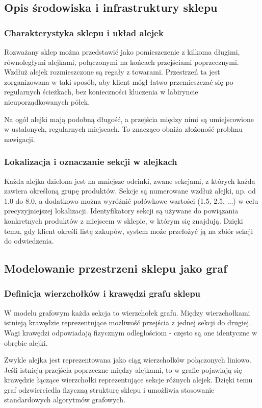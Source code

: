 \subsection{Opis środowiska i infrastruktury sklepu}

\subsubsection{Charakterystyka sklepu i układ alejek}
Rozważany sklep można przedstawić jako pomieszczenie z kilkoma długimi, równoległymi alejkami, połączonymi na końcach przejściami poprzecznymi. Wzdłuż alejek rozmieszczone są regały z towarami. Przestrzeń ta jest zorganizowana w taki sposób, aby klient mógł łatwo przemieszczać się po regularnych ścieżkach, bez konieczności kluczenia w labiryncie nieuporządkowanych półek.

Na ogół alejki mają podobną długość, a przejścia między nimi są umiejscowione w ustalonych, regularnych miejscach. To znacząco obniża złożoność problmu nawigacji.
\subsubsection{Lokalizacja i oznaczanie sekcji w alejkach}
Każda alejka dzielona jest na mniejsze odcinki, zwane sekcjami, z których każda zawiera określoną grupę produktów. Sekcje są numerowane wzdłuż alejki, np. od 1.0 do 8.0, a dodatkowo można wyróżnić połówkowe wartości (1.5, 2.5, ...) w celu precyzyjniejszej lokalizacji. Identyfikatory sekcji są używane do powiązania konkretnych produktów z miejscem w sklepie, w którym się znajdują. Dzięki temu, gdy klient określi listę zakupów, system może przełożyć ją na zbiór sekcji do odwiedzenia.

\subsection{Modelowanie przestrzeni sklepu jako graf}

\subsubsection{Definicja wierzchołków i krawędzi grafu sklepu}
W modelu grafowym każda sekcja to wierzchołek grafu. Między wierzchołkami istnieją krawędzie reprezentujące możliwość przejścia z jednej sekcji do drugiej. Wagi krawędzi odpowiadają fizycznym odległościom - często są one identyczne w obrębie alejki.

Zwykle alejka jest reprezentowana jako ciąg wierzchołków połączonych liniowo. Jeśli istnieją przejścia poprzeczne między alejkami, to w grafie pojawiają się krawędzie łączące wierzchołki reprezentujące sekcje różnych alejek. Dzięki temu graf odzwierciedla fizyczną strukturę sklepu i umożliwia stosowanie standardowych algorytmów grafowych.

